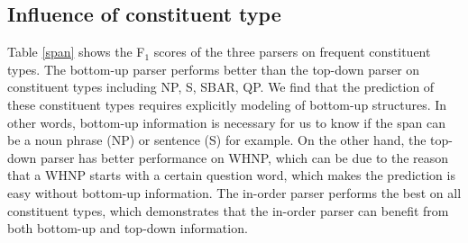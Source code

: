 \documentclass[11pt,letterpaper]{article}
\begin{document}
\subsection{Influence of constituent type}
Table \ref{span} shows the F$_1$ scores of the three parsers on frequent constituent types.
The bottom-up parser performs better than the top-down parser on constituent types including NP, S, SBAR, QP.
We find that the prediction of these constituent types requires explicitly modeling of bottom-up structures.
In other words, bottom-up information is necessary for us to know if the span can be a noun phrase (NP) or sentence (S) for example.
On the other hand, the top-down parser has better performance on WHNP, which can be due to the reason that a WHNP starts with a certain question word, which makes the prediction is easy without bottom-up information.
The in-order parser performs the best on all constituent types, which demonstrates that the in-order parser can benefit from both bottom-up and top-down information. 
\end{document}
